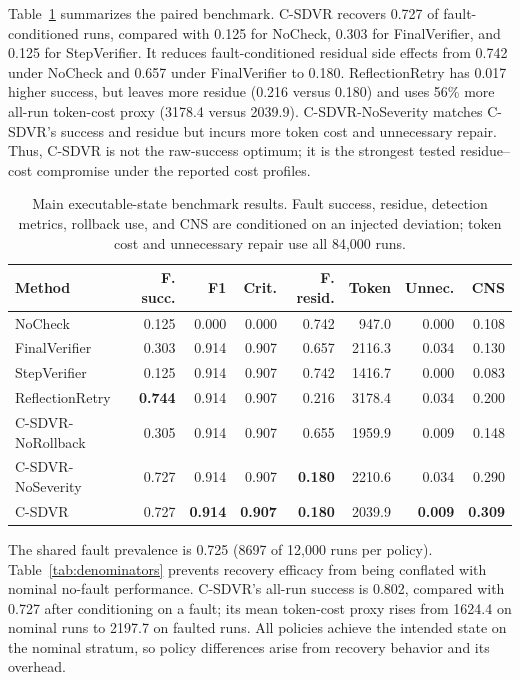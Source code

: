 \documentclass[pdflatex,sn-apa]{sn-jnl}
\begin{document}
Table~\ref{tab:main} summarizes the paired benchmark. C-SDVR recovers 0.727 of fault-conditioned runs, compared with 0.125 for NoCheck, 0.303 for FinalVerifier, and 0.125 for StepVerifier. It reduces fault-conditioned residual side effects from 0.742 under NoCheck and 0.657 under FinalVerifier to 0.180. ReflectionRetry has 0.017 higher success, but leaves more residue (0.216 versus 0.180) and uses 56\% more all-run token-cost proxy (3178.4 versus 2039.9). C-SDVR-NoSeverity matches C-SDVR's success and residue but incurs more token cost and unnecessary repair. Thus, C-SDVR is not the raw-success optimum; it is the strongest tested residue--cost compromise under the reported cost profiles.

\begin{table}[htbp]
\centering
\caption{Main executable-state benchmark results. Fault success, residue, detection metrics, rollback use, and CNS are conditioned on an injected deviation; token cost and unnecessary repair use all 84,000 runs.}
\label{tab:main}
\scriptsize
\setlength{\tabcolsep}{2.5pt}
\begin{tabular}{lrrrrrrr}
\toprule
Method & F. succ. & F1 & Crit. & F. resid. & Token & Unnec. & CNS \\
\midrule
NoCheck & 0.125 & 0.000 & 0.000 & 0.742 & 947.0 & 0.000 & 0.108 \\
FinalVerifier & 0.303 & 0.914 & 0.907 & 0.657 & 2116.3 & 0.034 & 0.130 \\
StepVerifier & 0.125 & 0.914 & 0.907 & 0.742 & 1416.7 & 0.000 & 0.083 \\
ReflectionRetry & \textbf{0.744} & 0.914 & 0.907 & 0.216 & 3178.4 & 0.034 & 0.200 \\
C-SDVR-NoRollback & 0.305 & 0.914 & 0.907 & 0.655 & 1959.9 & 0.009 & 0.148 \\
C-SDVR-NoSeverity & 0.727 & 0.914 & 0.907 & \textbf{0.180} & 2210.6 & 0.034 & 0.290 \\
C-SDVR & 0.727 & \textbf{0.914} & \textbf{0.907} & \textbf{0.180} & 2039.9 & \textbf{0.009} & \textbf{0.309} \\
\bottomrule
\end{tabular}
\end{table}

The shared fault prevalence is 0.725 (8697 of 12,000 runs per policy). Table~\ref{tab:denominators} prevents recovery efficacy from being conflated with nominal no-fault performance. C-SDVR's all-run success is 0.802, compared with 0.727 after conditioning on a fault; its mean token-cost proxy rises from 1624.4 on nominal runs to 2197.7 on faulted runs. All policies achieve the intended state on the nominal stratum, so policy differences arise from recovery behavior and its overhead.
\end{document}
